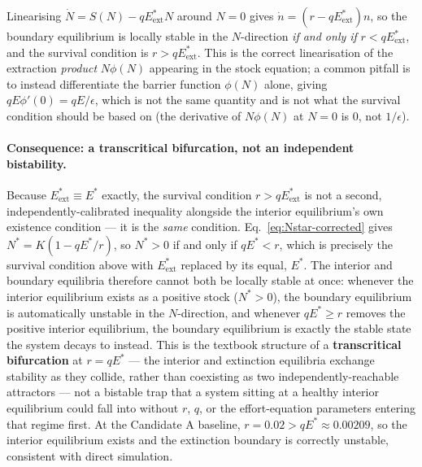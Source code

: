 \documentclass[twocolumn,10pt]{article}
\begin{document}
Linearising $\dot N=S(N)-qE^*_{\text{ext}}N$ around $N=0$ gives $\dot n=(r-qE^*_{\text{ext}})n$, so the boundary equilibrium is locally stable in the $N$-direction \emph{if and only if} $r<qE^*_{\text{ext}}$, and the survival condition is $r>qE^*_{\text{ext}}$. This is the correct linearisation of the extraction \emph{product} $N\phi(N)$ appearing in the stock equation; a common pitfall is to instead differentiate the barrier function $\phi(N)$ alone, giving $qE\phi'(0)=qE/\epsilon$, which is not the same quantity and is not what the survival condition should be based on (the derivative of $N\phi(N)$ at $N=0$ is $0$, not $1/\epsilon$).

\paragraph{Consequence: a transcritical bifurcation, not an independent bistability.} Because $E^*_{\text{ext}}\equiv E^*$ exactly, the survival condition $r>qE^*_{\text{ext}}$ is not a second, independently-calibrated inequality alongside the interior equilibrium's own existence condition — it is the \emph{same} condition. Eq.~\eqref{eq:Nstar-corrected} gives $N^*=K(1-qE^*/r)$, so $N^*>0$ if and only if $qE^*<r$, which is precisely the survival condition above with $E^*_{\text{ext}}$ replaced by its equal, $E^*$. The interior and boundary equilibria therefore cannot both be locally stable at once: whenever the interior equilibrium exists as a positive stock ($N^*>0$), the boundary equilibrium is automatically unstable in the $N$-direction, and whenever $qE^*\ge r$ removes the positive interior equilibrium, the boundary equilibrium is exactly the stable state the system decays to instead. This is the textbook structure of a \textbf{transcritical bifurcation} at $r=qE^*$ — the interior and extinction equilibria exchange stability as they collide, rather than coexisting as two independently-reachable attractors — not a bistable trap that a system sitting at a healthy interior equilibrium could fall into without $r$, $q$, or the effort-equation parameters entering that regime first. At the Candidate A baseline, $r=0.02>qE^*\approx0.00209$, so the interior equilibrium exists and the extinction boundary is correctly unstable, consistent with direct simulation.
\end{document}
